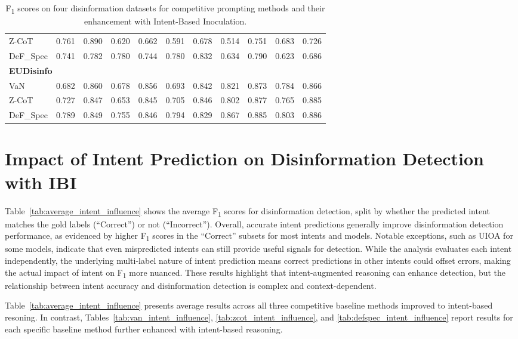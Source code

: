 \documentclass[11pt]{article}
\begin{document}
\begin{table}[!ht]
\begin{tabular}{lcccccccccc}
Z-CoT     & 0.761 & 0.890 & 0.620 & 0.662 & 0.591 & 0.678 & 0.514 & 0.751 & 0.683 & 0.726 \\
DeF\_Spec & 0.741 & 0.782 & 0.780 & 0.744 & 0.780 & 0.832 & 0.634 & 0.790 & 0.623 & 0.686 \\
\midrule
\multicolumn{11}{l}{\textbf{EUDisinfo}} \\
VaN       & 0.682 & 0.860 & 0.678 & 0.856 & 0.693 & 0.842 & 0.821 & 0.873 & 0.784 & 0.866 \\
Z-CoT     & 0.727 & 0.847 & 0.653 & 0.845 & 0.705 & 0.846 & 0.802 & 0.877 & 0.765 & 0.885 \\
DeF\_Spec & 0.789 & 0.849 & 0.755 & 0.846 & 0.794 & 0.829 & 0.867 & 0.885 & 0.803 & 0.886 \\
\bottomrule
\end{tabular}
\caption{F\textsubscript{1} scores on four disinformation datasets for competitive prompting methods and their enhancement with Intent-Based Inoculation.}
\label{tab:ibi_results_all_datasets}
\end{table}


\section{Impact of Intent Prediction on Disinformation Detection with IBI}
\label{sec:ablation_impact_intent_on_ibi}

Table~\ref{tab:average_intent_influence} shows the average F\textsubscript{1} scores for disinformation detection, split by whether the predicted intent matches the gold labels (“Correct”) or not (“Incorrect”). Overall, accurate intent predictions generally improve disinformation detection performance, as evidenced by higher F\textsubscript{1} scores in the “Correct” subsets for most intents and models. Notable exceptions, such as UIOA for some models, indicate that even mispredicted intents can still provide useful signals for detection. While the analysis evaluates each intent independently, the underlying multi-label nature of intent prediction means correct predictions in other intents could offset errors, making the actual impact of intent on F\textsubscript{1} more nuanced. These results highlight that intent-augmented reasoning can enhance detection, but the relationship between intent accuracy and disinformation detection is complex and context-dependent. 

Table~\ref{tab:average_intent_influence} presents average results across all three competitive baseline methods improved to intent-based resoning. In contrast, Tables~\ref{tab:van_intent_influence}, \ref{tab:zcot_intent_influence}, and \ref{tab:defspec_intent_influence} report results for each specific baseline method further enhanced with intent-based reasoning.
\end{document}
